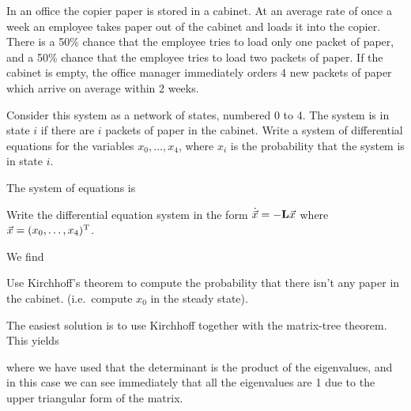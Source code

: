 In an office the copier paper is stored in a cabinet. At an average rate of once a week an employee takes paper out of the cabinet and loads it into the copier. There is a 50\% chance that the employee tries to load only one packet of paper, and a 50\% chance that the employee tries to load two packets of paper. If the cabinet is empty, the office manager immediately orders 4 new packets of paper which arrive on average within 2 weeks. 

\subquestion Consider this system as a network of states, numbered 0 to 4. The system is in state $i$ if there are $i$ packets of paper in the cabinet. Write a system of differential equations for the variables $x_0,\ldots,x_4$,
where $x_i$ is the probability that the system is in state $i$.

\solution
The system of equations is 

\subquestion Write the differential equation system in the form 
$\dot{\vec{x}}= -{\bf L} \vec{x}$
where $\vec{x}=(x_0,\ldots,x_4)^{\rm T}$.

\solution
We find 

\subquestion Use Kirchhoff's theorem to compute the probability that there isn't any paper in the cabinet. (i.e.~compute $x_0$ in the steady state).

\solution 
The easiest solution is to use Kirchhoff together with the matrix-tree theorem. This yields

where we have used that the determinant is the product of the eigenvalues, and in this case we can see immediately that all the eigenvalues are 1 due to the upper triangular form of the matrix.


